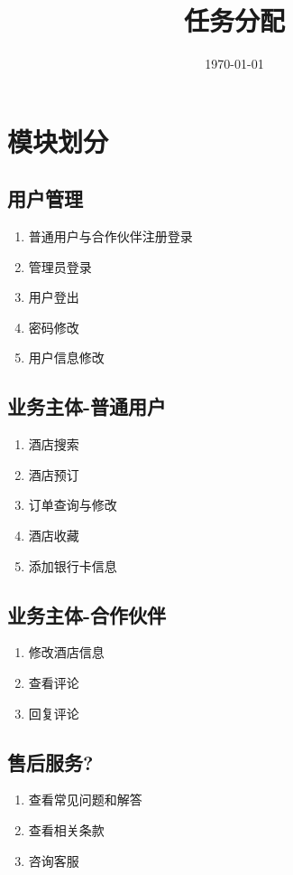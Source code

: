 \documentclass[18pt]{article}
\begin{document}
\tableofcontents
\title{任务分配}
\date{\today}
\maketitle

\section{模块划分}

	\subsection{用户管理}
	\begin{enumerate}
		\item 普通用户与合作伙伴注册登录
		\item 管理员登录
		\item 用户登出
		\item 密码修改
		\item 用户信息修改
	\end{enumerate}
	
	\subsection{业务主体-普通用户}
	\begin{enumerate}
		\item 酒店搜索
		\item 酒店预订
		\item 订单查询与修改
		\item 酒店收藏
		\item 添加银行卡信息
	\end{enumerate}
	
	\subsection{业务主体-合作伙伴}
	\begin{enumerate}
		\item 修改酒店信息
		\item 查看评论
		\item 回复评论
	\end{enumerate}
	
	\subsection{售后服务?}
	\begin{enumerate}
		\item 查看常见问题和解答
		\item 查看相关条款
		\item 咨询客服
	\end{enumerate}
	
\end{document}

